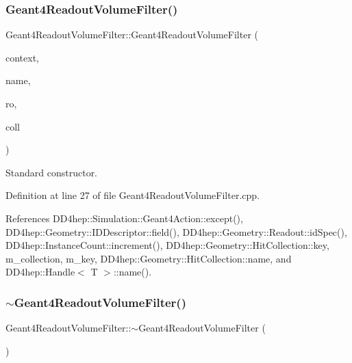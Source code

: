 \subsubsection{\texorpdfstring{Geant4\+Readout\+Volume\+Filter()}{Geant4ReadoutVolumeFilter()}}
{\footnotesize\ttfamily Geant4\+Readout\+Volume\+Filter\+::\+Geant4\+Readout\+Volume\+Filter (\begin{DoxyParamCaption}\item[{\hyperlink{class_d_d4hep_1_1_simulation_1_1_geant4_context}{Geant4\+Context} $\ast$}]{context,  }\item[{const std\+::string \&}]{name,  }\item[{\hyperlink{class_d_d4hep_1_1_simulation_1_1_geant4_readout_volume_filter_a30e6a3445a33de61e3c648149e285c46}{Readout}}]{ro,  }\item[{const std\+::string \&}]{coll }\end{DoxyParamCaption})}



Standard constructor. 



Definition at line 27 of file Geant4\+Readout\+Volume\+Filter.\+cpp.



References D\+D4hep\+::\+Simulation\+::\+Geant4\+Action\+::except(), D\+D4hep\+::\+Geometry\+::\+I\+D\+Descriptor\+::field(), D\+D4hep\+::\+Geometry\+::\+Readout\+::id\+Spec(), D\+D4hep\+::\+Instance\+Count\+::increment(), D\+D4hep\+::\+Geometry\+::\+Hit\+Collection\+::key, m\+\_\+collection, m\+\_\+key, D\+D4hep\+::\+Geometry\+::\+Hit\+Collection\+::name, and D\+D4hep\+::\+Handle$<$ T $>$\+::name().

\hypertarget{class_d_d4hep_1_1_simulation_1_1_geant4_readout_volume_filter_a36b9e4aa16116e85f3635ac891c60972}{}\label{class_d_d4hep_1_1_simulation_1_1_geant4_readout_volume_filter_a36b9e4aa16116e85f3635ac891c60972} 
\subsubsection{\texorpdfstring{$\sim$\+Geant4\+Readout\+Volume\+Filter()}{~Geant4ReadoutVolumeFilter()}}
{\footnotesize\ttfamily Geant4\+Readout\+Volume\+Filter\+::$\sim$\+Geant4\+Readout\+Volume\+Filter (\begin{DoxyParamCaption}{ }\end{DoxyParamCaption})\hspace{0.3cm}{\ttfamily [virtual]}}



